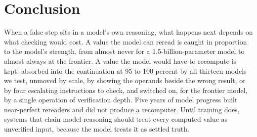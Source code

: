 \section{Conclusion}
\label{sec:conclusion}

When a false step sits in a model's own reasoning, what happens next depends on what checking would cost. A value the model can reread is caught in proportion to the model's strength, from almost never for a 1.5-billion-parameter model to almost always at the frontier. A value the model would have to recompute is kept: absorbed into the continuation at 95 to 100 percent by all thirteen models we test, unmoved by scale, by showing the operands beside the wrong result, or by four escalating instructions to check, and switched on, for the frontier model, by a single operation of verification depth. Five years of model progress built near-perfect rereaders and did not produce a recomputer. Until training does, systems that chain model reasoning should treat every computed value as unverified input, because the model treats it as settled truth.
